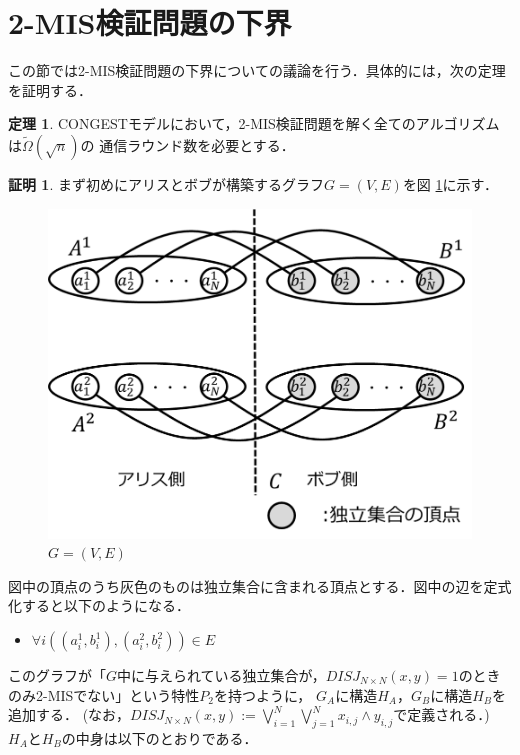 \documentclass[12pt]{thesis}
\newcommand{\CONGEST}{\textsf{CONGEST}}
\theoremstyle{definition}
\newtheorem{theorem}{定理}[chapter]
\newtheorem*{prf*}{証明}
\begin{document}
\section{2-MIS検証問題の下界}

この節では2-MIS検証問題の下界についての議論を行う．具体的には，次の定理を証明する．
\begin{theorem}
{\CONGEST}モデルにおいて，2-MIS検証問題を解く全てのアルゴリズムは$\tilde{\Omega} (\sqrt{n})$の
通信ラウンド数を必要とする．
\end{theorem}
\begin{prf*}
まず初めにアリスとボブが構築するグラフ$G = (V, E)$を図 \ref{2_G}に示す． 

\begin{figure}[ht]
\begin{center}
\includegraphics[width=120mm]{2_G.png}
\end{center}
\caption{$G = (V, E)$}
\label{2_G}
\end{figure}

図中の頂点のうち灰色のものは独立集合に含まれる頂点とする．図中の辺を定式化すると以下のようになる．
\begin{itemize}
\item $\forall i((a_{i}^{1}, b_{i}^{1}), (a_{i}^{2}, b_{i}^{2})) \in E$
\end{itemize}

このグラフが「$G$中に与えられている独立集合が，$DISJ_{N \times N} (x, y) = 1$のときのみ2-MISでない」という特性$P_{2}$を持つように，
$G_{A}$に構造$H_{A}$，$G_{B}$に構造$H_{B}$を追加する．
(なお，$DISJ_{N \times N} (x, y) :=\bigvee_{i = 1}^{N} \bigvee_{j = 1}^{N} x_{i, j} \land y_{i, j}$で定義される．)
$H_{A}$と$H_{B}$の中身は以下のとおりである．


\end{prf*}
\end{document}
